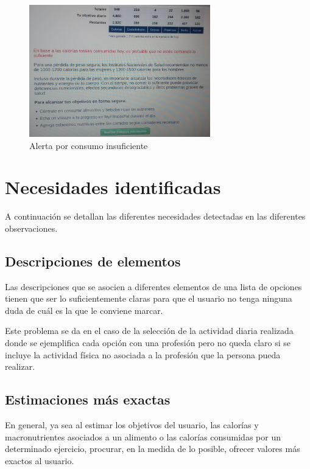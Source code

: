 \documentclass[a4paper]{article}
\begin{document}
			\begin{figure}[!h]
				\centering
				\includegraphics[width=0.7\textwidth]{./figuras/andoni5.jpg}
				\caption{Alerta por consumo insuficiente}
			\end{figure}
		\FloatBarrier
		

\section{Necesidades identificadas}

A continuación se detallan las diferentes necesidades detectadas en las diferentes observaciones.

	\subsection{Descripciones de elementos}
	
	Las descripciones que se asocien a diferentes elementos de una lista de opciones tienen que ser lo suficientemente claras para que el usuario no tenga ninguna duda de cuál es la que le conviene marcar.
	
	Este problema se da en el caso de la selección de la actividad diaria realizada donde se ejemplifica cada opción con una profesión pero no queda claro si se incluye la actividad física no asociada a la profesión que la persona pueda realizar.
	
	\subsection{Estimaciones más exactas}
	
	En general, ya sea al estimar los objetivos del usuario, las calorías y macronutrientes asociados a un alimento o las calorías consumidas por un determinado ejercicio, procurar, en la medida de lo posible, ofrecer valores más exactos al usuario.
	
\end{document}
